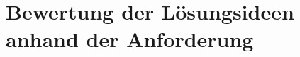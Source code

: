 

\chapter{Bewertung der Lösungsideen anhand der Anforderung}  %
\label{cha:AuswahlderLösunganhandAnforderungen} %



